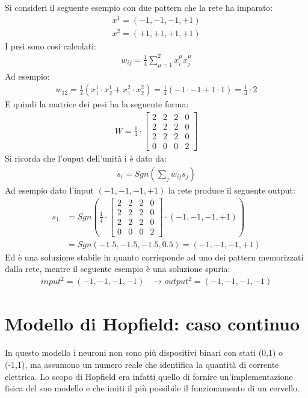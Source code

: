 Si consideri il seguente esempio con due pattern che la rete ha imparato:
\begin{align*}
	x^1 = (-1,-1,-1,+1) \\
	x^2 = (+1,+1,+1,+1)
\end{align*}
I pesi sono cosi calcolati:
\begin{align*}
	w_{ij} = \frac{1}{4} \sum_{\mu=1}^2 x_i^\mu x_j^\mu
\end{align*} 
Ad esempio:
\begin{align*}
	w_{12} = \frac{1}{4}(x^1_1 \cdot x^1_2 + x^2_1 \cdot x^2_2) = 
	\frac{1}{4}(-1 \cdot -1 + 1 \cdot 1) = \frac{1}{4} \cdot 2
\end{align*}
E quindi la matrice dei pesi ha la seguente forma:
\begin{align*}
	W = \frac{1}{4} \cdot
	\begin{bmatrix}
		2 & 2 & 2 & 0 \\
		2 & 2 & 2 & 0 \\
		2 & 2 & 2 & 0 \\
		0 & 0 & 0 & 2
	\end{bmatrix}
\end{align*}
Si ricorda che l'ouput dell'unità i è dato da:
\begin{align*}
	s_i = Sgn \left(\sum_j w_{ij} s_j \right)
\end{align*}
Ad esempio dato l'input $(-1,-1,-1,+1)$ la rete produce il seguente output:
\begin{align*}
	s_1 &= Sgn \left( \frac{1}{4} \cdot
	\begin{bmatrix}
		2 & 2 & 2 & 0 \\
		2 & 2 & 2 & 0 \\
		2 & 2 & 2 & 0 \\
		0 & 0 & 0 & 2
	\end{bmatrix} \cdot (-1, -1, -1, +1) \right) \\ 
	&= Sgn(-1.5, -1.5, -1.5, 0.5) = (-1,-1,-1,+1)
\end{align*}
Ed è una soluzione stabile in quanto corrisponde ad uno dei pattern memorizzati dalla rete, mentre il seguente esempio è una soluzione spuria:
\begin{align*}
	input^2 = (-1,-1,-1,-1)&\longrightarrow output^2 = (-1,-1,-1,-1) \tag{spuria}
\end{align*}


\newpage


\section{Modello di Hopfield: caso continuo} %
\label{sec:modello_di_hopfield_caso_continuo}
In questo modello i neuroni non sono più dispositivi binari con stati (0,1) o (-1,1), ma assumono un numero reale che identifica la quantità di corrente elettrica. Lo scopo di Hopfield era infatti quello di fornire un'implementazione fisica del suo modello e che imiti il più possibile il funzionamento di un cervello.\\

